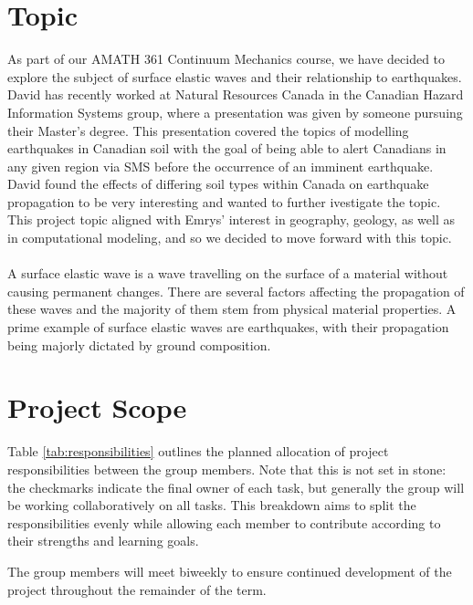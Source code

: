 \section{Topic}
As part of our AMATH 361 Continuum Mechanics course, we have decided to explore the subject of surface elastic waves and their relationship to earthquakes. David has recently worked at Natural Resources Canada in the Canadian Hazard Information Systems group, where a presentation was given by someone pursuing their Master's degree. This presentation covered the topics of modelling earthquakes in Canadian soil with the goal of being able to alert Canadians in any given region via SMS before the occurrence of an imminent earthquake. David found the effects of differing soil types within Canada on earthquake propagation to be very interesting and wanted to further ivestigate the topic. This project topic aligned with Emrys' interest in geography, geology, as well as in computational modeling, and so we decided to move forward with this topic.\\\\
A surface elastic wave is a wave travelling on the surface of a material without causing permanent changes. There are several factors affecting the propagation of these waves and the majority of them stem from physical material properties. A prime example of surface elastic waves are earthquakes, with their propagation being majorly dictated by ground composition.

\section{Project Scope}
Table \ref{tab:responsibilities} outlines the planned allocation of project responsibilities between the group members. Note that this is not set in stone: the checkmarks indicate the final owner of each task, but generally the group will be working collaboratively on all tasks. This breakdown aims to split the responsibilities evenly while allowing each member to contribute according to their strengths and learning goals.

The group members will meet biweekly to ensure continued development of the project throughout the remainder of the term.

